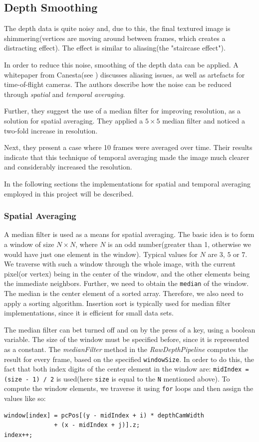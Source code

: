 \documentclass[]{article}
\begin{document}
\subsection{Depth Smoothing}
\label{sec:DepthSmoothing}
The depth data is quite noisy and, due to this, the final textured image is shimmering(vertices are moving around between frames, which creates a distracting effect). The effect is similar to aliasing(the "staircase effect").

In order to reduce this noise, smoothing of the depth data can be applied. A whitepaper from Canesta(see \cite{gokturk}) discusses aliasing issues, as well as artefacts for time-of-flight cameras. The authors describe how the noise can be reduced through \textit{spatial} and \textit{temporal averaging}. 

Further, they suggest the use of a median filter for improving resolution, as a solution for spatial averaging. They applied a $5 \times 5$ median filter and noticed a two-fold increase in resolution. 

Next, they present a case where 10 frames were averaged over time. Their results indicate that this technique of temporal averaging made the image much clearer and considerably increased the resolution.

In the following sections the implementations for spatial and temporal averaging employed in this project will be described.

\subsubsection{Spatial Averaging}

A median filter is used as a means for spatial averaging. The basic idea is to form a window of size $N \times N$, where $N$ is an odd number(greater than 1, otherwise we would have just one element in the window). Typical values for $N$ are $3$, $5$ or $7$. We traverse with such a window through the whole image, with the current pixel(or vertex) being in the center of the window, and the other elements being the immediate neighbors. Further, we need to obtain the \verb|median| of the window. The median is the center element of a sorted array. Therefore, we also need to apply a sorting algorithm. Insertion sort is typically used for median filter implementations, since it is efficient for small data sets.

The median filter can bet turned off and on by the press of a key, using a boolean variable. The size of the window must be specified before, since it is represented as a constant. The \textit{medianFilter} method in the \textit{RawDepthPipeline} computes the result for every frame, based on the specified \verb|windowSize|. In order to do this, the fact that both index digits of the center element in the window are: \verb|midIndex = (size - 1) / 2| is used(here \verb|size| is equal to the \verb|N| mentioned above). To compute the window elements, we traverse it using \verb|for| loops and then assign the values like so:
\begin{verbatim}
window[index] = pcPos[(y - midIndex + i) * depthCamWidth 
			  + (x - midIndex + j)].z;
index++;
\end{verbatim}
\end{document}
